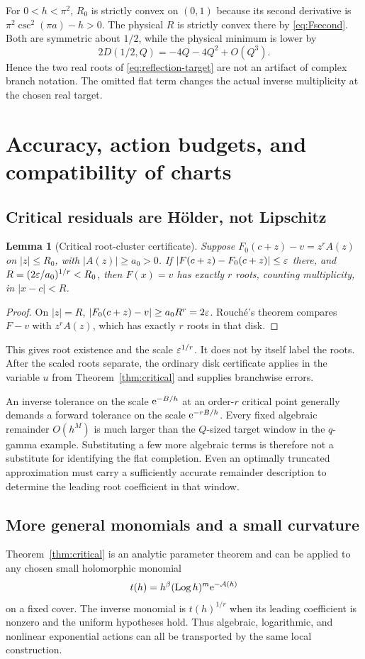 \documentclass[11pt,a4paper]{article}
\numberwithin{equation}{section}
\newtheorem{lemma}[theorem]{Lemma}
\theoremstyle{definition}
\theoremstyle{remark}\newtheorem{remark}[theorem]{Remark}
\newcommand{\Log}{\operatorname{Log}}\newcommand{\Li}{\operatorname{Li}}
\begin{document}
For $0<h<\pi^2$, $R_0$ is strictly convex on $(0,1)$ because its
second derivative is $\pi^2\csc^2(\pi a)-h>0$. The physical $R$ is
strictly convex there by \eqref{eq:Fsecond}. Both are symmetric about
$1/2$, while the physical minimum is lower by
\[
 2D(1/2,Q)=-4Q-4Q^2+O(Q^3).
\]
Hence the two real roots of \eqref{eq:reflection-target} are not an
artifact of complex branch notation. The omitted flat term changes the
actual inverse multiplicity at the chosen real target.

\section{Accuracy, action budgets, and compatibility of charts}
\label{sec:accuracy}

\subsection{Critical residuals are H\"older, not Lipschitz}
\begin{lemma}[Critical root-cluster certificate]\label{lem:critical-bound}
Suppose $F_0(c+z)-v=z^r A(z)$ on $|z|\le R_0$, with
$|A(z)|\ge a_0>0$. If $|F(c+z)-F_0(c+z)|\le\varepsilon$ there, and
$R=(2\varepsilon/a_0)^{1/r}<R_0$, then $F(x)=v$ has exactly $r$ roots,
counting multiplicity, in $|x-c|<R$.
\end{lemma}
\begin{proof}
On $|z|=R$, $|F_0(c+z)-v|\ge a_0R^r=2\varepsilon$.
Rouch\'e's theorem compares $F-v$ with $z^rA(z)$, which has exactly
$r$ roots in that disk.
\end{proof}
This gives root existence and the scale $\varepsilon^{1/r}$. It does not by
itself label the roots. After the scaled roots separate, the ordinary
disk certificate applies in the variable $u$ from
Theorem~\ref{thm:critical} and supplies branchwise errors.

An inverse tolerance on the scale $\mathrm e^{-B/h}$ at an order-$r$ critical
point generally demands a forward tolerance on the scale
$\mathrm e^{-rB/h}$. Every fixed algebraic remainder $O(h^M)$ is much larger
than the $Q$-sized target window in the $q$-gamma example. Substituting a
few more algebraic terms is therefore not a substitute for identifying
the flat completion. Even an optimally truncated approximation must
carry a sufficiently accurate remainder description to determine the
leading root coefficient in that window.

\subsection{More general monomials and a small curvature}
Theorem~\ref{thm:critical} is an analytic parameter theorem and can be
applied to any chosen small holomorphic monomial
\[
 t(h)=h^\beta(\Log h)^m\e^{-\mathcal A(h)}
\]
on a fixed cover. The inverse monomial is $t(h)^{1/r}$ when its leading
coefficient is nonzero and the uniform hypotheses hold. Thus algebraic,
logarithmic, and nonlinear exponential actions can all be transported
by the same local construction.
\end{document}
